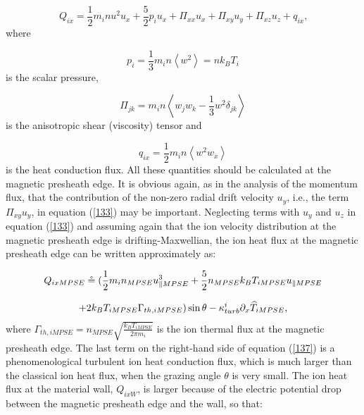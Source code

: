 \documentclass[11pt]{article}
\begin{document}
\begin{equation}
Q_{ix}=\frac{1}{2}m_{i}nu^{2}u_{x}+\frac{5}{2}p_{i}u_{x}+\Pi_{xx}u_{x}+%
\Pi_{xy}u_{y}+\Pi_{xz}u_{z}+q_{ix}\text{,}   \label{133}
\end{equation}
where

\begin{equation}
p_{i}=\frac{1}{3}m_{i}n\left\langle w^{2}\right\rangle =nk_{B}T_{i} 
\label{134}
\end{equation}
is the scalar pressure,

\begin{equation}
\Pi_{jk}=m_{i}n\left\langle w_{j}w_{k}-\frac{1}{3}w^{2}\delta_{jk}\right%
\rangle   \label{135}
\end{equation}
is the anisotropic shear (viscosity) tensor and

\begin{equation}
q_{ix}=\frac{1}{2}m_{i}n\left\langle w^{2}w_{x}\right\rangle   \label{136}
\end{equation}
is the heat conduction flux. All these quantities should be calculated at
the magnetic presheath edge. It is obvious again, as in the analysis of the
momentum flux, that the contribution of the non-zero radial drift velocity $%
u_{y}$, i.e., the term $\Pi_{xy}u_{y}$, in equation (\ref{133}) may be
important. Neglecting terms with $u_{y}$ and $u_{z}$ in equation (\ref{133})
and assuming again that the ion velocity distribution at the magnetic
presheath edge is drifting-Maxwellian, the ion heat flux at the magnetic
presheath edge can be written approximately as:

\begin{equation*}
Q_{ixMPSE}\circeq{\Huge (}\frac{1}{2}m_{i}n_{MPSE}u_{\Vert MPSE}^{3}+\frac
{5}{2}n_{MPSE}k_{B}T_{iMPSE}u_{\Vert MPSE}
\end{equation*}

\begin{equation}
+2k_{B}T_{iMPSE}\Gamma_{th,iMPSE}{\Huge )}\sin\theta-\kappa_{turb}^{i}%
\partial_{x}\widehat{T}_{iMPSE}\text{,}   \label{137}
\end{equation}
\bigskip where $\Gamma_{th,iMPSE}=n_{MPSE}\sqrt{\frac{k_{B}T_{iMPSE}}{2\pi
m_{i}}}$ is the ion thermal flux at the magnetic presheath edge. The last
term on the right-hand side of equation (\ref{137}) is a phenomenological
turbulent ion heat conduction flux, which is much larger than the classical
ion heat flux, when the grazing angle $\theta$ is very small. The ion heat
flux at the material wall, $Q_{ixW}$, is larger because of the electric
potential drop between the magnetic presheath edge and the wall, so that:
\end{document}
